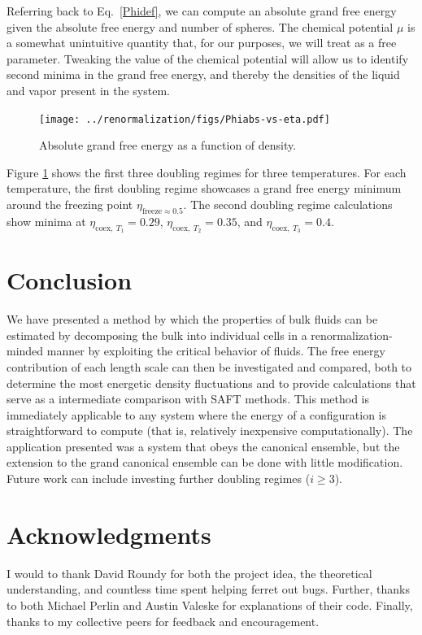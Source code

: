 \documentclass[12pt]{article}
\begin{document}
Referring back to Eq.~\ref{Phidef}, we can compute an absolute grand free energy given the absolute free energy and number of spheres. The chemical potential $\mu$ is a somewhat unintuitive quantity that, for our purposes, we will treat as a free parameter. Tweaking the value of the chemical potential will allow us to identify second minima in the grand free energy, and thereby the densities of the liquid and vapor present in the system.
\begin{figure}[H]
\centering
    \texttt{[image: ../renormalization/figs/Phiabs-vs-eta.pdf]}
    \caption{Absolute grand free energy as a function of density.}
    \label{Phi-eta}
\end{figure}
Figure \ref{Phi-eta} shows the first three doubling regimes for three temperatures. For each temperature, the first doubling regime showcases a grand free energy minimum around the freezing point $\eta_{\text{freeze}\approx 0.5}$. The second doubling regime calculations show minima at $\eta_{\text{coex},~T_1} = 0.29$, $\eta_{\text{coex},~T_2} = 0.35$, and $\eta_{\text{coex},~T_3} = 0.4$. 


\section{Conclusion}
We have presented a method by which the properties of bulk fluids can be estimated by decomposing the bulk into individual cells in a renormalization-minded manner by exploiting the critical behavior of fluids. The free energy contribution of each length scale can then be investigated and compared, both to determine the most energetic density fluctuations and to provide calculations that serve as a intermediate comparison with SAFT methods. This method is immediately applicable to any system where the energy of a configuration is straightforward to compute (that is, relatively inexpensive computationally). The application presented was a system that obeys the canonical ensemble, but the extension to the grand canonical ensemble can be done with little modification. Future work can include investing further doubling regimes ($i\geq 3$). 

\section{Acknowledgments}
I would to thank David Roundy for both the project idea, the theoretical understanding, and countless time spent helping ferret out bugs. Further, thanks to both Michael Perlin and Austin Valeske for explanations of their code. Finally, thanks to my collective peers for feedback and encouragement.
%
\cleardoublepage

\end{document}
